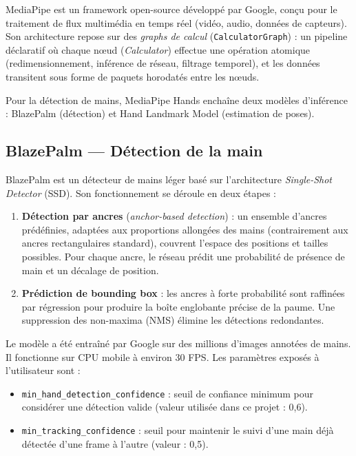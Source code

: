 \documentclass[12pt, a4paper]{article}
\newcommand{\code}[1]{\texttt{\small #1}}
\begin{document}
MediaPipe est un framework open-source développé par Google, conçu pour le
traitement de flux multimédia en temps réel (vidéo, audio, données de capteurs).
Son architecture repose sur des \emph{graphs de calcul} (\code{CalculatorGraph}) :
un pipeline déclaratif où chaque nœud (\emph{Calculator}) effectue une opération
atomique (redimensionnement, inférence de réseau, filtrage temporel), et les
données transitent sous forme de paquets horodatés entre les nœuds.

Pour la détection de mains, MediaPipe Hands enchaîne deux modèles d'inférence :
BlazePalm (détection) et Hand Landmark Model (estimation de poses).

\subsection{BlazePalm --- Détection de la main}

BlazePalm est un détecteur de mains léger basé sur l'architecture
\emph{Single-Shot Detector} (SSD). Son fonctionnement se déroule en deux étapes :

\begin{enumerate}
  \item \textbf{Détection par ancres} (\emph{anchor-based detection}) : un ensemble
        d'ancres prédéfinies, adaptées aux proportions allongées des mains (contrairement
        aux ancres rectangulaires standard), couvrent l'espace des positions et
        tailles possibles. Pour chaque ancre, le réseau prédit une probabilité
        de présence de main et un décalage de position.
  \item \textbf{Prédiction de bounding box} : les ancres à forte probabilité sont
        raffinées par régression pour produire la boîte englobante précise de la paume.
        Une suppression des non-maxima (NMS) élimine les détections redondantes.
\end{enumerate}

Le modèle a été entraîné par Google sur des millions d'images annotées de mains.
Il fonctionne sur CPU mobile à environ 30 FPS. Les paramètres exposés à
l'utilisateur sont :

\begin{itemize}
  \item \code{min\_hand\_detection\_confidence} : seuil de confiance minimum pour
        considérer une détection valide (valeur utilisée dans ce projet : 0,6).
  \item \code{min\_tracking\_confidence} : seuil pour maintenir le suivi d'une main
        déjà détectée d'une frame à l'autre (valeur : 0,5).
\end{itemize}
\end{document}
